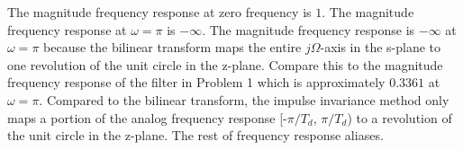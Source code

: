 \documentclass[fleqn]{article}
\begin{document}
\begin{enumerate}[nolistsep]
\begin{enumerate}
			The magnitude frequency response at zero frequency is $1$. The magnitude frequency response at $\omega = \pi$ is $-\infty$. The magnitude frequency response is $-\infty$ at $\omega=\pi$ because the bilinear transform maps the entire $j\Omega$-axis in the s-plane to one revolution of the unit circle in the z-plane. Compare this to the magnitude frequency response of the filter in Problem 1 which is approximately $0.3361$ at $\omega = \pi$. Compared to the bilinear transform, the impulse invariance method only maps a portion of the analog frequency response [-$\pi/T_d$, $\pi/T_d$) to a revolution of the unit circle in the z-plane. The rest of frequency response aliases.
			
			
		\end{enumerate}
	\end{enumerate}
\end{document}
